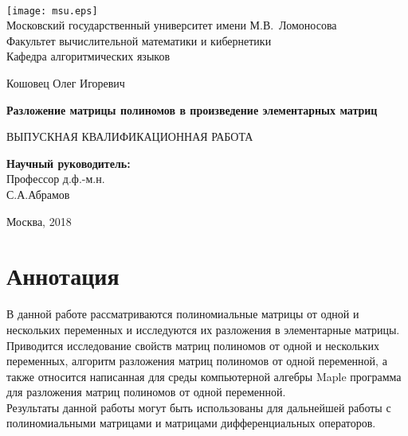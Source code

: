 \documentclass[14pt, a4paper]{extreport}
\begin{document}
\thispagestyle{empty}

\begin{center}
	\ \vspace{-3cm}

	\texttt{[image: msu.eps]}\\
	{Московский государственный университет имени М.В.~Ломоносова}\\
	Факультет вычислительной математики и кибернетики\\
	Кафедра алгоритмических языков

	\vspace{5cm}

	{\Large Кошовец Олег Игоревич}

	\vspace{1cm}

	{\Large\bfseries
	Разложение матрицы полиномов в произведение элементарных матриц\\}

	\vspace{1cm}

	{\large ВЫПУСКНАЯ КВАЛИФИКАЦИОННАЯ РАБОТА}
\end{center}

\vfill

\begin{flushright}
	\textbf{Научный руководитель:}\\
	Профессор д.ф.-м.н.\\
	С.А.Абрамов
\end{flushright}

\vfill


\begin{center}
	Москва, 2018
\end{center}

\newpage
\renewcommand{\contentsname}{Содержание}
\tableofcontents
\clearpage
\newpage

\chapter{Аннотация}
	В данной работе рассматриваются полиномиальные матрицы от одной и нескольких переменных
	и исследуются их разложения в элементарные матрицы. Приводится исследование свойств матриц полиномов
	от одной и нескольких переменных, алгоритм разложения матриц полиномов от одной переменной,
	а также относится написанная для среды компьютерной алгебры Maple программа для разложения
	матриц полиномов от одной переменной.\\
	Результаты данной работы могут быть использованы для дальнейшей работы с полиномиальными матрицами
	и матрицами дифференциальных операторов.
\end{document}
